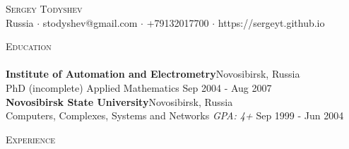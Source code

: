 \documentclass[a4paper]{article}
\newcommand{\lineunder} {
    \vspace*{-8pt} \\
    \hspace*{-18pt} \hrulefill \\
}
\newcommand{\header} [1] {
    {\hspace*{-18pt}\vspace*{6pt} \textsc{#1}}
    \vspace*{-6pt} \lineunder
}
\begin{document}
\vspace*{-40pt}

    

\vspace*{-10pt}
\begin{center}
	{\Huge \scshape {Sergey Todyshev}}\\
	Russia $\cdot$ stodyshev@gmail.com $\cdot$ +79132017700 $\cdot$ https://sergeyt.github.io\\
\end{center}

\header{Education}
\textbf{Institute of Automation and Electrometry}\hfill Novosibirsk, Russia\\
PhD (incomplete) Applied Mathematics \hfill Sep 2004 - Aug 2007\\
\vspace{2mm}
\textbf{Novosibirsk State University}\hfill Novosibirsk, Russia\\
Computers, Complexes, Systems and Networks \textit{GPA: 4+} \hfill Sep 1999 - Jun 2004\\
\vspace{2mm}

\header{Experience}
\vspace{1mm}
\end{document}
